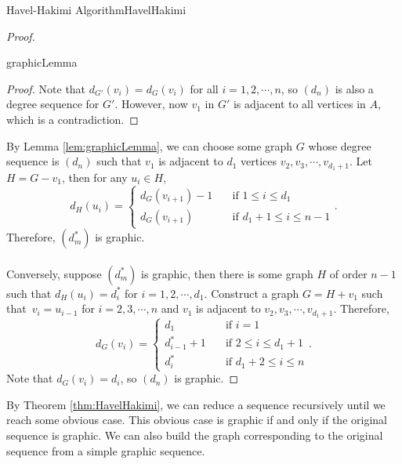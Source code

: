 \documentclass[math, code]{amznotes}
\theoremstyle{remark}
\begin{document}
\begin{thmbox}{Havel-Hakimi Algorithm}{HavelHakimi}
\begin{proof}
\begin{lembox}{}{graphicLemma}
\begin{proof}
                Note that $d_{G'}(v_i) = d_G(v_i)$ for all $i = 1, 2, \cdots, n$, so $(d_n)$ is also a degree sequence for $G'$. However, now $v_1$ in $G'$ is adjacent to all vertices in $A$, which is a contradiction.
            \end{proof}
        \end{lembox}
        By Lemma \ref{lem:graphicLemma}, we can choose some graph $G$ whose degree sequence is $(d_n)$ such that $v_1$ is adjacent to $d_1$ vertices $v_2, v_3, \cdots, v_{d_1 + 1}$. Let $H = G - v_1$, then for any $u_i \in H$,
        \begin{equation*}
            d_H(u_i) = \begin{cases}
                d_G(v_{i + 1}) - 1 & \quad\textrm{if } 1 \leq i \leq d_1 \\
                d_G(v_{i + 1}) & \quad\textrm{if } d_1 + 1 \leq i \leq n - 1
            \end{cases}.
        \end{equation*}
        Therefore, $\left(d^*_m\right)$ is graphic.
        \\\\
        Conversely, suppose $\left(d^*_m\right)$ is graphic, then there is some graph $H$ of order $n - 1$ such that $d_H(u_i) = d^*_i$ for $i = 1, 2, \cdots, d_1$. Construct a graph $G = H + v_1$ such that~$v_i = u_{i - 1}$ for $i = 2, 3, \cdots, n$ and $v_1$ is adjacent to $v_2, v_3, \cdots, v_{d_1 + 1}$. Therefore,
        \begin{equation*}
            d_G(v_i) = \begin{cases}
                d_1 & \quad\textrm{if } i = 1 \\
                d^*_{i - 1} + 1 & \quad\textrm{if } 2 \leq i \leq d_1 + 1 \\
                d^*_{i} & \quad\textrm{if } d_1 + 2 \leq i \leq n
            \end{cases}.
        \end{equation*}
        Note that $d_G(v_i) = d_i$, so $(d_n)$ is graphic.
    \end{proof}
\end{thmbox}
By Theorem \ref{thm:HavelHakimi}, we can reduce a sequence recursively until we reach some obvious case. This obvious case is graphic if and only if the original sequence is graphic. We can also build the graph corresponding to the original sequence from a simple graphic sequence.
\end{document}
